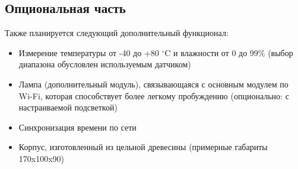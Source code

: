 \documentclass[a4paper,14pt]{extarticle}
\begin{document}
\subsection{Опциональная часть}

Также планируется следующий дополнительный функционал:
\begin{itemize}
	\item
		Измерение температуры от -40 до +80 $^\circ$C
		и влажности от 0 до 99\% (выбор диапазона обусловлен
		используемым датчиком)
	\item
		Лампа (дополнительный модуль), связывающаяся с 
		основным модулем по Wi-Fi, которая способствует
		более легкому пробуждению (опционально: с настраиваемой
		подсветкой)
	\item
		Синхронизация времени по сети
	\item
		Корпус, изготовленный из цельной древесины 
		(примерные габариты 170x100x90)
\end{itemize}




\end{document}
